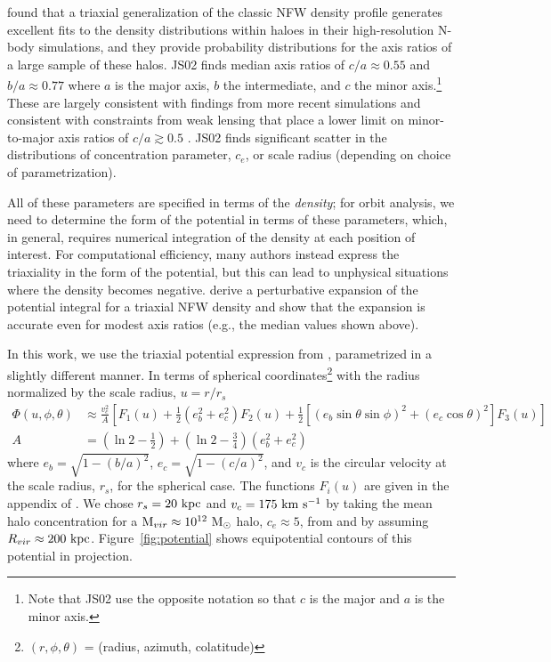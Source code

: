 \documentclass[letterpaper,12pt,preprint]{aastex}
\newcommand{\msun}{\ensuremath{\mathrm{M}_\odot}}
\begin{document}
 \citet[][hereafter JS02]{jing02} found that a triaxial generalization of the classic NFW density profile \citep{navarro96} generates excellent fits to the density distributions within haloes in their high-resolution N-body simulations, and they provide probability distributions for the axis ratios of a large sample of these halos. JS02 finds median axis ratios of $c/a \approx 0.55$ and $b/a \approx 0.77$ where $a$ is the major axis, $b$ the intermediate, and $c$ the minor axis.\footnote{Note that JS02 use the opposite notation so that $c$ is the major and $a$ is the minor axis.} These are largely consistent with findings from more recent simulations \citep[e.g.,][]{??, NiHao} and consistent with constraints from weak lensing that place a lower limit on minor-to-major axis ratios of $c/a\gtrsim0.5$ \citep{vanuitert12}. JS02 finds significant scatter in the distributions of concentration parameter, $c_e$, or scale radius (depending on choice of parametrization). 

All of these parameters are specified in terms of the \emph{density}; for orbit analysis, we need to determine the form of the potential in terms of these parameters, which, in general, requires numerical integration of the density at each position of interest. For computational efficiency, many authors instead express the triaxiality in the form of the potential, but this can lead to unphysical situations where the density becomes negative. \citet{leesuto03} derive a perturbative expansion of the potential integral for a triaxial NFW density and show that the expansion is accurate even for modest axis ratios (e.g., the median values shown above). 

In this work, we use the triaxial potential expression from \citet{leesuto03}, parametrized in a slightly different manner. In terms of spherical coordinates\footnote{$(r,\phi,\theta)$ = (radius, azimuth, colatitude)} with the radius normalized by the scale radius, $u = r/r_s$
\begin{align}
	\Phi(u,\phi,\theta) &\approx \frac{v_c^2}{A}\left[F_1(u) + \frac{1}{2}(e_b^2 + e_c^2)F_2(u) + \frac{1}{2} [(e_b\sin\theta \sin\phi)^2 + (e_c\cos\theta)^2] F_3(u) \right]\\
	A &= \left(\ln2 - \frac{1}{2}\right) + \left(\ln2-\frac{3}{4}\right) (e_b^2 + e_c^2)
\end{align}
where $e_b = \sqrt{1 - (b/a)^2}$, $e_c = \sqrt{1 - (c/a)^2}$, and $v_c$ is the circular velocity at the scale radius, $r_s$, for the spherical case. The functions $F_i(u)$ are given in the appendix of \cite{leesuto03}. We chose $r_s=20~{\rm kpc}$ and $v_c = 175~{\rm km}~{\rm s}^{-1}$ by taking the mean halo concentration for a ${\rm M}_{vir} \approx 10^{12}~\msun$ halo, $c_e\approx5$, from \cite{jing02} and by assuming $R_{vir}\approx200~{\rm kpc}$. Figure~\ref{fig:potential} shows equipotential contours of this potential in projection.
\end{document}
